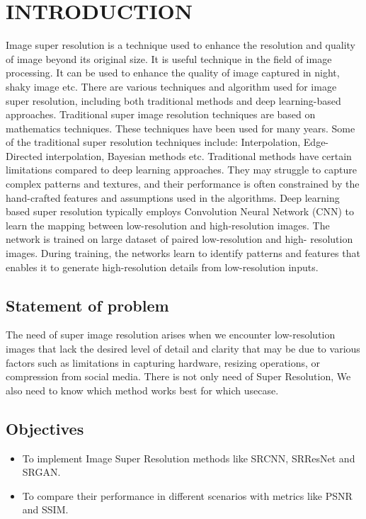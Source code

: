 \newpage
{}
\section{INTRODUCTION}
Image super resolution is a technique used to enhance the resolution and quality of
image beyond its original size. It is useful technique in the field of image processing. It
can be used to enhance the quality of image captured in night, shaky image etc. There
are various techniques and algorithm used for image super resolution, including both
traditional methods and deep learning-based approaches. Traditional super image
resolution techniques are based on mathematics techniques. These techniques have
been used for many years. Some of the traditional super resolution techniques include:
Interpolation, Edge-Directed interpolation, Bayesian methods etc. Traditional methods
have certain limitations compared to deep learning approaches. They may struggle to
capture complex patterns and textures, and their performance is often constrained by
the hand-crafted features and assumptions used in the algorithms.
Deep learning based super resolution typically employs Convolution Neural
Network (CNN) to learn the mapping between low-resolution and high-resolution
images. The network is trained on large dataset of paired low-resolution and high-
resolution images. During training, the networks learn to identify patterns and features
that enables it to generate high-resolution details from low-resolution inputs.


\subsection{Statement of problem}
The need of super image resolution arises when we encounter low-resolution images
that lack the desired level of detail and clarity that may be due to various factors such as limitations in capturing hardware, resizing
operations, or compression from social media. There is not only need of Super Resolution, We also need to know which method works best for which usecase.

\subsection{Objectives} 
\begin{itemize}
    \item To implement Image Super Resolution methods like SRCNN, SRResNet and SRGAN.
    \item To compare their performance in different scenarios with metrics like PSNR and SSIM.
\end{itemize}


